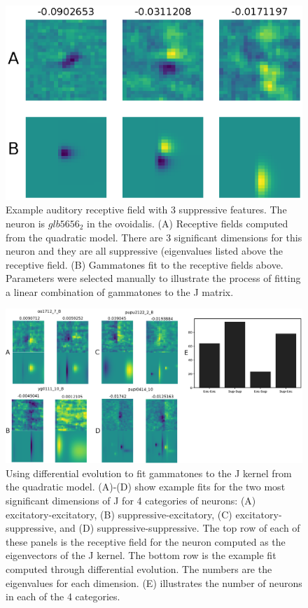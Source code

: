 \documentclass{article}
\begin{document}
\begin{figure}
  \centering
  \includegraphics[width=1.0\linewidth]{Figures/Figure2.eps}
  \caption{Example auditory receptive field with 3 suppressive features. The neuron is $glb5656_2$ in the ovoidalis. (A) Receptive fields computed from the quadratic model. There are 3 significant dimensions for this neuron and they are all suppressive (eigenvalues listed above the receptive field. (B) Gammatones fit to the receptive fields above. Parameters were selected manually to illustrate the process of fitting a linear combination of gammatones to the J matrix.}
\end{figure}

\begin{figure}
  \centering
  \includegraphics[width=1.0\linewidth]{Figures/Figure3.eps}
  \caption{Using differential evolution to fit gammatones to the J kernel from the quadratic model. (A)-(D) show example fits for the two most significant dimensions of J for 4 categories of neurons: (A) excitatory-excitatory, (B) suppressive-excitatory, (C) excitatory-suppressive, and (D) suppressive-suppressive. The top row of each of these panels is the receptive field for the neuron computed as the eigenvectors of the J kernel. The bottom row is the example fit computed through differential evolution. The numbers are the eigenvalues for each dimension. (E) illustrates the number of neurons in each of the 4 categories.}
\end{figure}
\end{document}
